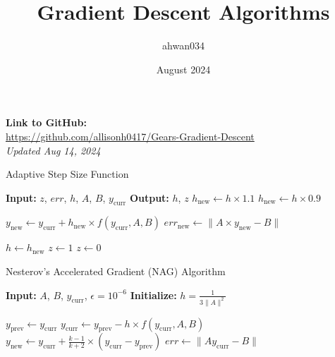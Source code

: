 \documentclass[11pt]{article}
\title{Gradient Descent Algorithms}
\author{ahwan034 }
\date{August 2024}
\begin{document}
\maketitle

\textbf{Link to GitHub:} \\
\url{https://github.com/allisonh0417/Gears-Gradient-Descent} \\
\textit{Updated Aug 14, 2024}



\begin{algorithm}[H]
\caption{Adaptive Step Size Function}
\begin{algorithmic}
\State \textbf{Input:}  $z$,  $err$,  $h$,  $A$, $B$, $y_{\text{curr}}$
\State \textbf{Output:} $h$, $z$
    \State $h_{\text{new}} \gets h \times 1.1$ 
\Else
    \State $h_{\text{new}} \gets h \times 0.9$ 
\EndIf

\State $y_{\text{new}} \gets y_{\text{curr}} + h_{\text{new}} \times f(y_{\text{curr}}, A, B)$
\State $err_{\text{new}} \gets \|A \times y_{\text{new}} - B\|$
    
    \State $h \gets h_{\text{new}}$ 
    \State $z \gets 1$
\Else
    \State $z \gets 0$
\EndIf
\end{algorithmic}
\end{algorithm}

\begin{algorithm}[H]
\caption{Nesterov's Accelerated Gradient (NAG) Algorithm}
\begin{algorithmic}
\State \textbf{Input:}  $A$, $B$, $y_{\text{curr}}$,  $\epsilon = 10^{-6}$
\State \textbf{Initialize:}  $h = \frac{1}{3\|A\|^2}$


    \State $y_{\text{prev}} \gets y_{\text{curr}}$
    \State $y_{\text{curr}} \gets y_{\text{prev}} - h \times f(y_{\text{curr}}, A, B)$
    \State $y_{\text{new}} \gets y_{\text{curr}} + \frac{k-1}{k+2} \times (y_{\text{curr}} - y_{\text{prev}})$
    \State $err \gets \|A y_{\text{curr}} - B\|$

\EndWhile
\end{algorithmic}
\end{algorithm}
\end{document}
